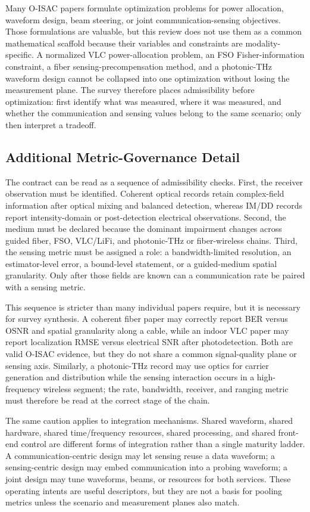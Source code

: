 \documentclass[letterpaper,journal]{IEEEtran}
\begin{document}
Many O-ISAC papers formulate optimization problems for power allocation, waveform design, beam steering, or joint communication-sensing objectives. Those formulations are valuable, but this review does not use them as a common mathematical scaffold because their variables and constraints are modality-specific. A normalized VLC power-allocation problem, an FSO Fisher-information constraint, a fiber sensing-precompensation method, and a photonic-THz waveform design cannot be collapsed into one optimization without losing the measurement plane. The survey therefore places admissibility before optimization: first identify what was measured, where it was measured, and whether the communication and sensing values belong to the same scenario; only then interpret a tradeoff.

\subsection{Additional Metric-Governance Detail}

The contract can be read as a sequence of admissibility checks. First, the receiver observation must be identified. Coherent optical records retain complex-field information after optical mixing and balanced detection, whereas IM/DD records report intensity-domain or post-detection electrical observations. Second, the medium must be declared because the dominant impairment changes across guided fiber, FSO, VLC/LiFi, and photonic-THz or fiber-wireless chains. Third, the sensing metric must be assigned a role: a bandwidth-limited resolution, an estimator-level error, a bound-level statement, or a guided-medium spatial granularity. Only after those fields are known can a communication rate be paired with a sensing metric.

This sequence is stricter than many individual papers require, but it is necessary for survey synthesis. A coherent fiber paper may correctly report BER versus OSNR and spatial granularity along a cable, while an indoor VLC paper may report localization RMSE versus electrical SNR after photodetection. Both are valid O-ISAC evidence, but they do not share a common signal-quality plane or sensing axis. Similarly, a photonic-THz record may use optics for carrier generation and distribution while the sensing interaction occurs in a high-frequency wireless segment; the rate, bandwidth, receiver, and ranging metric must therefore be read at the correct stage of the chain.

The same caution applies to integration mechanisms. Shared waveform, shared hardware, shared time/frequency resources, shared processing, and shared front-end control are different forms of integration rather than a single maturity ladder. A communication-centric design may let sensing reuse a data waveform; a sensing-centric design may embed communication into a probing waveform; a joint design may tune waveforms, beams, or resources for both services. These operating intents are useful descriptors, but they are not a basis for pooling metrics unless the scenario and measurement planes also match.
\end{document}
